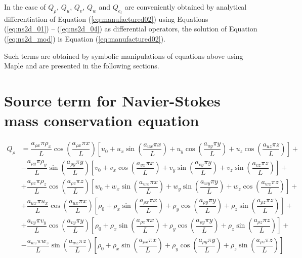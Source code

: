 \documentclass[10pt]{article}
\begin{document}
\begin{landscape}
In the case of $Q_\rho$, $Q_u$, $Q_v$, $Q_w$ and $Q_{e_t}$ are conveniently obtained by analytical differentiation of Equation ({\ref{eq:manufactured02}}) using Equations~ (\ref{eq:ns2d_01}) -- (\ref{eq:ns2d_04}) as differential operators, the solution of Equation (\ref{eq:ns2d_mod}) is  Equation (\ref{eq:manufactured02}).

Such terms are obtained by symbolic manipulations of equations above using Maple and are presented in the following sections.

\section{Source term for  Navier-Stokes mass conservation equation}

\begin{equation}
\begin{split}
Q_\rho &= \dfrac{ a_{\rho x} \pi \rho_x}{L}\cos\left(\dfrac{a_{\rho x} \pi x}{L}\right) \left[u_0+u_x \sin\left(\dfrac{a_{ux} \pi x}{L}\right)+u_y \cos\left(\dfrac{a_{uy} \pi y}{L}\right)+u_z \cos\left(\dfrac{a_{uz} \pi z}{L}\right)\right]  +\\
&-\dfrac{a_{\rho y} \pi\rho_y }{L} \sin\left(\dfrac{a_{\rho y} \pi y}{L}\right) \left[v_0+v_x \cos\left(\dfrac{a_{vx} \pi x}{L}\right)+v_y \sin\left(\dfrac{a_{vy} \pi y}{L}\right)+v_z \sin\left(\dfrac{a_{vz} \pi z}{L}\right)\right] +\\
& +\dfrac{a_{\rho z} \pi\rho_z}{L} \cos\left(\dfrac{a_{\rho z} \pi z}{L}\right) \left[w_0+w_x \sin\left(\dfrac{a_{wx} \pi x}{L}\right)+w_y \sin\left(\dfrac{a_{wy} \pi y}{L}\right)+w_z \cos\left(\dfrac{a_{wz} \pi z}{L}\right)\right]  +\\
& + \dfrac{a_{ux} \pi u_x }{L}\cos\left(\dfrac{a_{ux} \pi x}{L}\right) \left[\rho_0+\rho_x \sin\left(\dfrac{a_{\rho x} \pi x}{L}\right)+\rho_y \cos\left(\dfrac{a_{\rho y} \pi y}{L}\right)+\rho_z \sin\left(\dfrac{a_{\rho z} \pi z}{L}\right)\right]  +\\
& +\dfrac{a_{vy} \pi v_y }{L} \cos\left(\dfrac{a_{vy} \pi y}{L}\right) \left[\rho_0+\rho_x \sin\left(\dfrac{a_{\rho x} \pi x}{L}\right)+\rho_y \cos\left(\dfrac{a_{\rho y} \pi y}{L}\right)+\rho_z \sin\left(\dfrac{a_{\rho z} \pi z}{L}\right)\right] +\\
& -\dfrac{a_{wz} \pi w_z}{L}  \sin\left(\dfrac{a_{wz} \pi z}{L}\right) \left[\rho_0+\rho_x \sin\left(\dfrac{a_{\rho x} \pi x}{L}\right)+\rho_y \cos\left(\dfrac{a_{\rho y} \pi y}{L}\right)+\rho_z \sin\left(\dfrac{a_{\rho z} \pi z}{L}\right)\right] \\
\end{split}
\end{equation}




\end{landscape}
\end{document}
